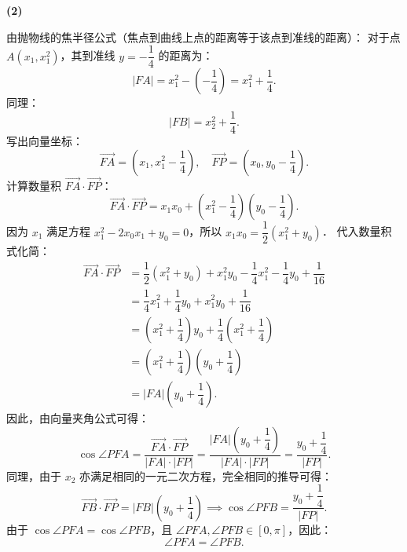 \begin{answer}
\textbf{(2)}

由抛物线的焦半径公式（焦点到曲线上点的距离等于该点到准线的距离）：
对于点 $A(x_1, x_1^2)$，其到准线 $y = -\dfrac{1}{4}$ 的距离为：
\nopagebreak[4]
\[
|FA| = x_1^2 - \left(-\dfrac{1}{4}\right) = x_1^2 + \dfrac{1}{4}.
\]
同理：
\nopagebreak[4]
\[
|FB| = x_2^2 + \dfrac{1}{4}.
\]
写出向量坐标：
\nopagebreak[4]
\[
\vec{FA} = \left(x_1, x_1^2 - \dfrac{1}{4}\right), \quad \vec{FP} = \left(x_0, y_0 - \dfrac{1}{4}\right).
\]
计算数量积 $\vec{FA} \cdot \vec{FP}$：
\nopagebreak[4]
\[
\vec{FA} \cdot \vec{FP} = x_1 x_0 + \left(x_1^2 - \dfrac{1}{4}\right)\left(y_0 - \dfrac{1}{4}\right).
\]
因为 $x_1$ 满足方程 $x_1^2 - 2x_0 x_1 + y_0 = 0$，所以 $x_1 x_0 = \dfrac{1}{2}(x_1^2 + y_0)$．
代入数量积式化简：
\nopagebreak[4]
\[
\begin{aligned}
\vec{FA} \cdot \vec{FP} &= \dfrac{1}{2}(x_1^2 + y_0) + x_1^2 y_0 - \dfrac{1}{4}x_1^2 - \dfrac{1}{4}y_0 + \dfrac{1}{16} \\
&= \dfrac{1}{4}x_1^2 + \dfrac{1}{4}y_0 + x_1^2 y_0 + \dfrac{1}{16} \\
&= \left(x_1^2 + \dfrac{1}{4}\right)y_0 + \dfrac{1}{4}\left(x_1^2 + \dfrac{1}{4}\right) \\
&= \left(x_1^2 + \dfrac{1}{4}\right)\left(y_0 + \dfrac{1}{4}\right) \\
&= |FA|\left(y_0 + \dfrac{1}{4}\right).
\end{aligned}
\]
因此，由向量夹角公式可得：
\nopagebreak[4]
\[
\cos\angle PFA = \dfrac{\vec{FA} \cdot \vec{FP}}{|FA| \cdot |FP|} = \dfrac{|FA|\left(y_0 + \dfrac{1}{4}\right)}{|FA| \cdot |FP|} = \dfrac{y_0 + \dfrac{1}{4}}{|FP|}.
\]
同理，由于 $x_2$ 亦满足相同的一元二次方程，完全相同的推导可得：
\nopagebreak[4]
\[
\vec{FB} \cdot \vec{FP} = |FB|\left(y_0 + \dfrac{1}{4}\right) \implies \cos\angle PFB = \dfrac{y_0 + \dfrac{1}{4}}{|FP|}.
\]
由于 $\cos\angle PFA = \cos\angle PFB$，且 $\angle PFA, \angle PFB \in [0, \pi]$，因此：
\nopagebreak[4]
\[
\angle PFA = \angle PFB.
\]



\end{answer}